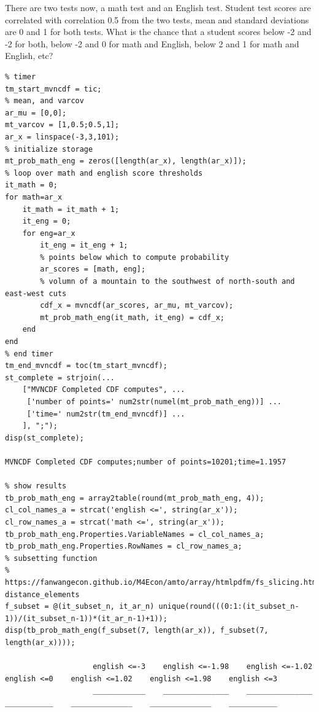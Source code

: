\documentclass[
]{book}
\begin{document}
There are two tests now, a math test and an English test. Student test
scores are correlated with correlation 0.5 from the two tests, mean and
standard deviations are 0 and 1 for both tests. What is the chance that
a student scores below -2 and -2 for both, below -2 and 0 for math and
English, below 2 and 1 for math and English, etc?

\begin{verbatim}
% timer
tm_start_mvncdf = tic;
% mean, and varcov
ar_mu = [0,0];
mt_varcov = [1,0.5;0.5,1];
ar_x = linspace(-3,3,101);
% initialize storage
mt_prob_math_eng = zeros([length(ar_x), length(ar_x)]);
% loop over math and english score thresholds
it_math = 0;
for math=ar_x
    it_math = it_math + 1;
    it_eng = 0;
    for eng=ar_x
        it_eng = it_eng + 1;
        % points below which to compute probability 
        ar_scores = [math, eng];
        % volumn of a mountain to the southwest of north-south and east-west cuts
        cdf_x = mvncdf(ar_scores, ar_mu, mt_varcov);
        mt_prob_math_eng(it_math, it_eng) = cdf_x;
    end
end
% end timer
tm_end_mvncdf = toc(tm_start_mvncdf);
st_complete = strjoin(...
    ["MVNCDF Completed CDF computes", ...
     ['number of points=' num2str(numel(mt_prob_math_eng))] ...
     ['time=' num2str(tm_end_mvncdf)] ...
    ], ";");
disp(st_complete);

MVNCDF Completed CDF computes;number of points=10201;time=1.1957

% show results
tb_prob_math_eng = array2table(round(mt_prob_math_eng, 4));
cl_col_names_a = strcat('english <=', string(ar_x'));
cl_row_names_a = strcat('math <=', string(ar_x'));
tb_prob_math_eng.Properties.VariableNames = cl_col_names_a;
tb_prob_math_eng.Properties.RowNames = cl_row_names_a;
% subsetting function
% https://fanwangecon.github.io/M4Econ/amto/array/htmlpdfm/fs_slicing.html#19_Given_Array_of_size_M,_Select_N_somewhat_equi-distance_elements
f_subset = @(it_subset_n, it_ar_n) unique(round(((0:1:(it_subset_n-1))/(it_subset_n-1))*(it_ar_n-1)+1));
disp(tb_prob_math_eng(f_subset(7, length(ar_x)), f_subset(7, length(ar_x))));

                    english <=-3    english <=-1.98    english <=-1.02    english <=0    english <=1.02    english <=1.98    english <=3
                    ____________    _______________    _______________    ___________    ______________    ______________    ___________


\end{verbatim}
\end{document}
